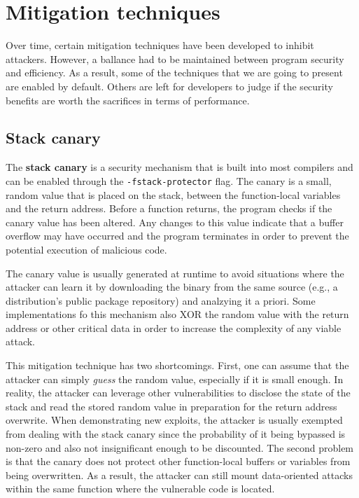 \section{Mitigation techniques}

Over time, certain mitigation techniques have been developed to inhibit
attackers. However, a ballance had to be maintained between program security
and efficiency. As a result, some of the techniques that we are going to
present are enabled by default. Others are left for developers to judge if the
security benefits are worth the sacrifices in terms of performance.

\subsection{Stack canary}

The \textbf{stack canary} is a security mechanism that is built into most
compilers and can be enabled through the \texttt{-fstack-protector} flag. The
canary is a small, random value that is placed on the stack, between the
function-local variables and the return address. Before a function returns, the
program checks if the canary value has been altered. Any changes to this value
indicate that a buffer overflow may have occurred and the program terminates
in order to prevent the potential execution of malicious code.

The canary value is usually generated at runtime to avoid situations where the
attacker can learn it by downloading the binary from the same source (e.g., a
distribution's public package repository) and analzying it a priori. Some
implementations fo this mechanism also XOR the random value with the return
address or other critical data in order to increase the complexity of any
viable attack.

This mitigation technique has two shortcomings. First, one can assume that the
attacker can simply \textit{guess} the random value, especially if it is small
enough. In reality, the attacker can leverage other vulnerabilities to disclose
the state of the stack and read the stored random value in preparation for the
return address overwrite. When demonstrating new exploits, the attacker is
usually exempted from dealing with the stack canary since the probability of it
being bypassed is non-zero and also not insignificant enough to be discounted.
The second problem is that the canary does not protect other function-local
buffers or variables from being overwritten. As a result, the attacker can
still mount data-oriented attacks within the same function where the
vulnerable code is located.

